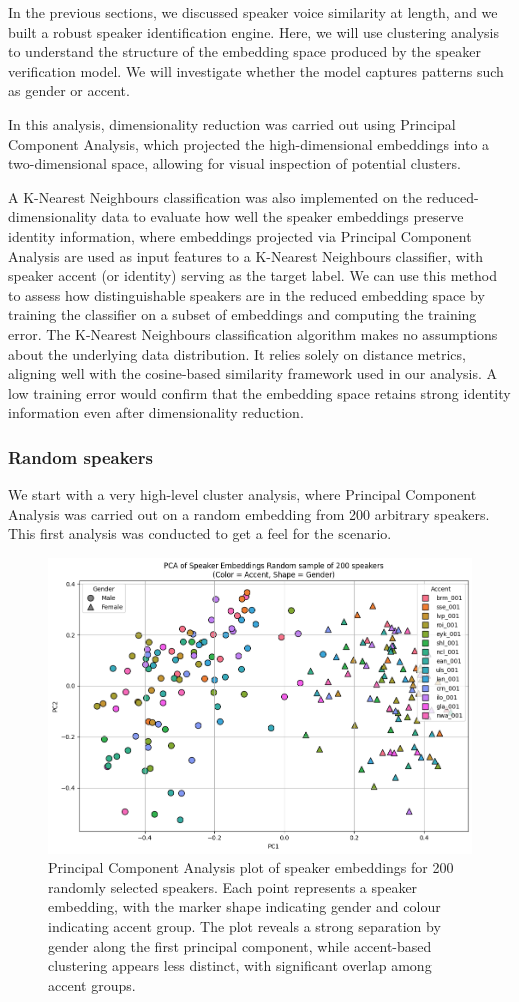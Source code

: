 \documentclass[conference]{IEEEtran}
\begin{document}
	In the previous sections, we discussed speaker voice similarity at length, and we built a robust speaker identification engine. Here, we will use clustering analysis to understand the structure of the embedding space produced by the speaker verification model. We will investigate whether the model captures patterns such as gender or accent.
	
	In this analysis, dimensionality reduction was carried out using Principal Component Analysis, which projected the high-dimensional embeddings into a two-dimensional space, allowing for visual inspection of potential clusters.
	
	A K-Nearest Neighbours classification was also implemented on the reduced-dimensionality data to evaluate how well the speaker embeddings preserve identity information, where embeddings projected via Principal Component Analysis are used as input features to a K-Nearest Neighbours classifier, with speaker accent (or identity) serving as the target label. We can use this method to assess how distinguishable speakers are in the reduced embedding space by training the classifier on a subset of embeddings and computing the training error. The K-Nearest Neighbours classification algorithm makes no assumptions about the underlying data distribution. It relies solely on distance metrics, aligning well with the cosine-based similarity framework used in our analysis. A low training error would confirm that the embedding space retains strong identity information even after dimensionality reduction.
	
	\subsubsection{Random speakers}
	
	We start with a very high-level cluster analysis, where Principal Component Analysis was carried out on a random embedding from 200 arbitrary speakers. This first analysis was conducted to get a feel for the scenario.
	
	\begin{figure}[H]
		\centering
		\includegraphics[width=0.7\linewidth]{img/img-cluster-all}
		\caption{Principal Component Analysis plot of speaker embeddings for 200 randomly selected speakers. Each point represents a speaker embedding, with the marker shape indicating gender and colour indicating accent group. The plot reveals a strong separation by gender along the first principal component, while accent-based clustering appears less distinct, with significant overlap among accent groups.}
		\label{fig:img-cluster-all}
	\end{figure}
	
\end{document}
